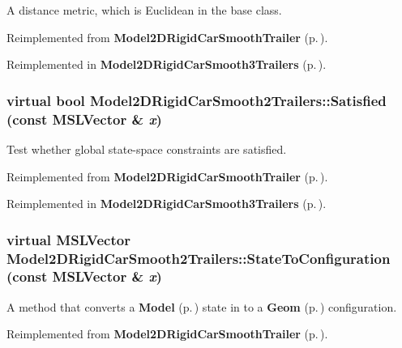 A distance metric, which is Euclidean in the base class.



Reimplemented from {\bf Model2DRigid\-Car\-Smooth\-Trailer} {\rm (p.\,\pageref{class_Model2DRigidCarSmoothTrailer_a3})}.

Reimplemented in {\bf Model2DRigid\-Car\-Smooth3Trailers} {\rm (p.\,\pageref{class_Model2DRigidCarSmooth3Trailers_a3})}.
\subsubsection{\setlength{\rightskip}{0pt plus 5cm}virtual bool Model2DRigid\-Car\-Smooth2Trailers::Satisfied (const {\bf MSLVector} \& {\em x})\hspace{0.3cm}{\tt  [virtual]}}\label{class_Model2DRigidCarSmooth2Trailers_a5}


Test whether global state-space constraints are satisfied.



Reimplemented from {\bf Model2DRigid\-Car\-Smooth\-Trailer} {\rm (p.\,\pageref{class_Model2DRigidCarSmoothTrailer_a5})}.

Reimplemented in {\bf Model2DRigid\-Car\-Smooth3Trailers} {\rm (p.\,\pageref{class_Model2DRigidCarSmooth3Trailers_a5})}.
\subsubsection{\setlength{\rightskip}{0pt plus 5cm}virtual {\bf MSLVector} Model2DRigid\-Car\-Smooth2Trailers::State\-To\-Configuration (const {\bf MSLVector} \& {\em x})\hspace{0.3cm}{\tt  [virtual]}}\label{class_Model2DRigidCarSmooth2Trailers_a4}


A method that converts a {\bf Model} {\rm (p.\,\pageref{class_Model})} state in to a {\bf Geom} {\rm (p.\,\pageref{class_Geom})} configuration.



Reimplemented from {\bf Model2DRigid\-Car\-Smooth\-Trailer} {\rm (p.\,\pageref{class_Model2DRigidCarSmoothTrailer_a4})}.

